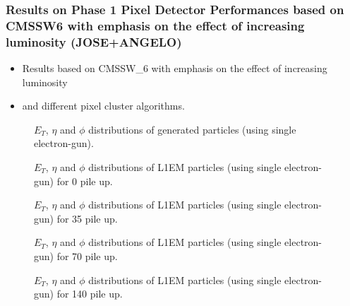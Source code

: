 \subsubsection{Results on Phase 1 Pixel Detector Performances based on CMSSW6 with emphasis on the effect of increasing luminosity
(JOSE+ANGELO)}

\begin{itemize}
\item Results based on CMSSW\_6 with emphasis on the effect of increasing luminosity
\item and different pixel cluster algorithms.
\end{itemize}

\begin{figure}[!htb]
  \centering
  \caption{$E_{T}$, $\eta$ and $\phi$ distributions of generated particles (using single electron-gun).}
  \label{}
\end{figure}

\begin{figure}[!htb]
  \centering
  \caption{$E_{T}$, $\eta$ and $\phi$ distributions of L1EM particles (using single electron-gun) for 0 pile up.}
  \label{}
\end{figure}

\begin{figure}[!htb]
  \centering
  \caption{$E_{T}$, $\eta$ and $\phi$ distributions of L1EM particles (using single electron-gun) for 35 pile up.}
  \label{}
\end{figure}

\begin{figure}[!htb]
  \centering
  \caption{$E_{T}$, $\eta$ and $\phi$ distributions of L1EM particles (using single electron-gun) for 70 pile up.}
  \label{}
\end{figure}

\begin{figure}[!htb]
  \centering
  \caption{$E_{T}$, $\eta$ and $\phi$ distributions of L1EM particles (using single electron-gun) for 140 pile up.}
  \label{}
\end{figure}

